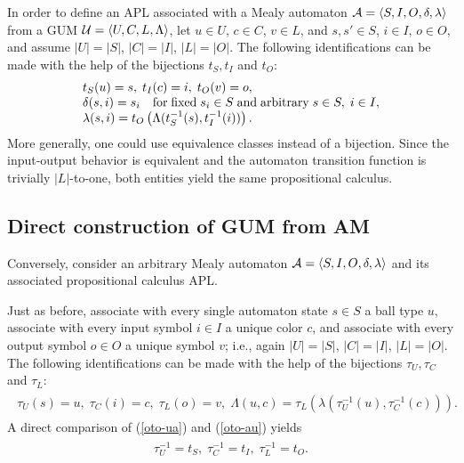 In order to define an APL associated with a Mealy automaton
${\cal A}=\langle S,I,O,\delta ,\lambda \rangle$
from a GUM ${\cal U}=\langle U,C,L,\Lambda \rangle $,
let
$u\in U$,
$c\in C$,
$v\in L$,
and
$s,s'\in S$,
$i\in I$,
$o\in O$, and assume
$\vert U\vert =\vert S\vert$,
$\vert C\vert =\vert I\vert$,
$\vert L\vert =\vert O\vert$.
The following identifications can be made
with the help of the bijections $t_S,t_I$ and $t_O$:
\begin{equation}
\begin{array}{llllll}
t_S(u)=s, \;
 t_I(c)=i, \;
 t_O(v)=o, \\
\delta (s,i)= s_i  \quad {\rm for \; fixed\;}s_i\in S {\rm \;and \;
arbitrary\;}s\in S,\; i\in I,\\
\lambda  (s,i) = t_O\left(\Lambda (t_S^{-1}(s),t_I^{-1}(i))\right).
\end{array}
\label{oto-ua}
\end{equation}
More generally, one could use equivalence classes instead of a bijection.
Since the input-output behavior is equivalent and the
automaton transition function is trivially $\vert L\vert $-to-one,
both entities yield the same propositional calculus.




\subsection{Direct construction of GUM from AM}

Conversely,
consider an arbitrary Mealy automaton ${\cal A}=\langle S,I,O,\delta ,\lambda \rangle$
and its associated propositional calculus APL.

Just as before, associate with every single automaton state $s\in S$
a ball type $u$,
associate with every input symbol $i\in I$
a unique color $c$,
and
associate with every output symbol $o\in O$
a unique symbol $v$; i.e., again
$\vert U\vert =\vert S\vert$,
$\vert C\vert =\vert I\vert$,
$\vert L\vert =\vert O\vert$.
The following identifications can be made
with the help of the bijections $\tau_U,\tau_C$ and $\tau_L$:
\begin{eqnarray}
\begin{array}{llllll}
\tau_U(s)=u, \; \tau_C(i)=c, \;  \tau_L(o)=v, \;
\Lambda  (u,c) = \tau_L (\lambda (\tau_U^{-1}(u),\tau_C^{-1}(c))).
\end{array}
\label{oto-au}
\end{eqnarray}
A direct comparison of
(\ref{oto-ua})
and
(\ref{oto-au})
yields
\begin{eqnarray}
\begin{array}{llllll}
\tau_U^{-1}=t_S, \; \tau_C^{-1}=t_I, \;  \tau_L^{-1}=t_O.
\end{array}
\label{oto-oto}
\end{eqnarray}


